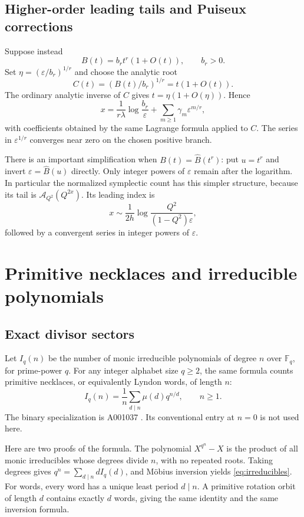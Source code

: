 \documentclass[11pt]{article}
\numberwithin{equation}{section}
\theoremstyle{definition}
\newcommand{\F}{\mathbb F}
\newcommand{\eps}{\varepsilon}
\begin{document}
\subsection{Higher-order leading tails and Puiseux corrections}

Suppose instead
\[
 B(t)=b_rt^r(1+O(t)),\qquad b_r>0.
\]
Set $\eta=(\eps/b_r)^{1/r}$ and choose the analytic root
\[
 C(t)=\left(B(t)/b_r\right)^{1/r}=t(1+O(t)).
\]
The ordinary analytic inverse of $C$ gives $t=\eta(1+O(\eta))$. Hence
\begin{equation}\label{eq:puiseux-endpoint}
 x=\frac1{r\lambda}\log\frac{b_r}{\eps}
       +\sum_{m\ge1}\gamma_m\eps^{m/r},
\end{equation}
with coefficients obtained by the same Lagrange formula applied to $C$. The series in $\eps^{1/r}$ converges near zero on the chosen positive branch.

There is an important simplification when $B(t)=\widehat B(t^r)$: put $u=t^r$ and invert $\eps=\widehat B(u)$ directly. Only integer powers of $\eps$ remain after the logarithm. In particular the normalized symplectic count has this simpler structure, because its tail is $\mathcal A_{Q^2}(Q^{2x})$. Its leading index is
\[
 x\sim\frac1{2h}\log\frac{Q^2}{(1-Q^2)\eps},
\]
followed by a convergent series in integer powers of $\eps$.

\section{Primitive necklaces and irreducible polynomials}
\label{sec:arithmetic}

\subsection{Exact divisor sectors}

Let $I_q(n)$ be the number of monic irreducible polynomials of degree $n$ over $\F_q$, for prime-power $q$. For any integer alphabet size $q\ge2$, the same formula counts primitive necklaces, or equivalently Lyndon words, of length $n$:
\begin{equation}\label{eq:irreducibles}
 I_q(n)=\frac1n\sum_{d\mid n}\mu(d)q^{n/d},\qquad n\ge1.
\end{equation}
The binary specialization is A001037 \cite{oeisI}. Its conventional entry at $n=0$ is not used here.

Here are two proofs of the formula. The polynomial $X^{q^n}-X$ is the product of all monic irreducibles whose degrees divide $n$, with no repeated roots. Taking degrees gives
$q^n=\sum_{d\mid n}dI_q(d)$, and M\"obius inversion yields \eqref{eq:irreducibles}. For words, every word has a unique least period $d\mid n$. A primitive rotation orbit of length $d$ contains exactly $d$ words, giving the same identity and the same inversion formula.
\end{document}

